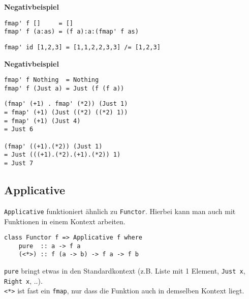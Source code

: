 \documentclass{beamer}
\begin{document}
\begin{frame}[fragile]
\begin{important}\begin{center}\textbf{Negativbeispiel}\end{center}\end{important}
\begin{verbatim}
fmap' f []     = []
fmap' f (a:as) = (f a):a:(fmap' f as)
\end{verbatim}
\pause
\begin{verbatim}
fmap' id [1,2,3] = [1,1,2,2,3,3] /= [1,2,3]
\end{verbatim}
\end{frame}

\begin{frame}[fragile]
\begin{important}\begin{center}\textbf{Negativbeispiel}\end{center}\end{important}
\begin{verbatim}
fmap' f Nothing  = Nothing
fmap' f (Just a) = Just (f (f a))
\end{verbatim}
\pause
\begin{verbatim}
(fmap' (+1) . fmap' (*2)) (Just 1)
= fmap' (+1) (Just ((*2) ((*2) 1))
= fmap' (+1) (Just 4)
= Just 6

(fmap' ((+1).(*2)) (Just 1) 
= Just (((+1).(*2).(+1).(*2)) 1)
= Just 7
\end{verbatim}

\end{frame}


\subsection{Applicative}
\begin{frame}[fragile]
\texttt{Applicative} funktioniert ähnlich zu \texttt{Functor}. Hierbei kann man auch mit Funktionen in einem Kontext arbeiten.\\
\pause
\begin{verbatim}
class Functor f => Applicative f where
    pure  :: a -> f a
    (<*>) :: f (a -> b) -> f a -> f b
\end{verbatim}
\pause
\texttt{pure} bringt etwas in den Standardkontext (z.B. Liste mit 1 Element, \texttt{Just x}, \texttt{Right x}, ..).\\
\texttt{<*>} ist fast ein \texttt{fmap}, nur dass die Funktion auch in demselben Kontext liegt.
\end{frame}
\end{document}
